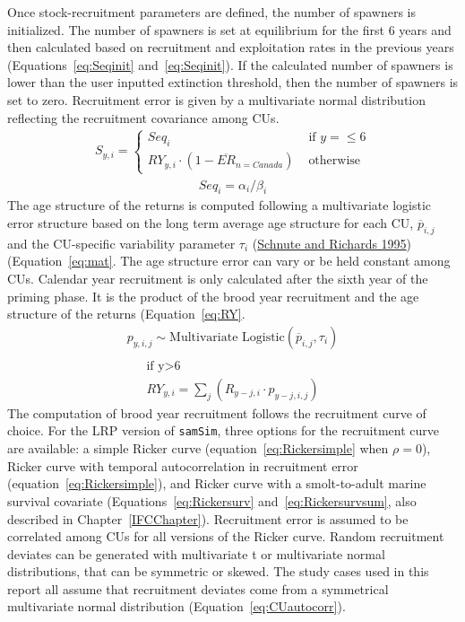 \documentclass[11pt]{book}
\begin{document}
Once stock-recruitment parameters are defined, the number of spawners is initialized. The number of spawners is set at equilibrium for the first 6 years and then calculated based on recruitment and exploitation rates in the previous years (Equations~\ref{eq:Seqinit} and~\ref{eq:Seqinit}). If the calculated number of spawners is lower than the user inputted extinction threshold, then the number of spawners is set to zero. Recruitment error is given by a multivariate normal distribution reflecting the recruitment covariance among CUs.
\begin{align}
S_{y,i} =
 \begin{cases}
   Seq_{i} &\text{ if } y = \leq 6\\
   RY_{y,i} \cdot (1- \overline{ER}_{n=Canada}) &\text{ otherwise}
  \end{cases}
  \label{eq:Seqinit}
\end{align}
\begin{align}
Seq_{i} = \alpha_{i}/\beta_{i}
\label{eq:Seq}
\end{align}
The age structure of the returns is computed following a multivariate logistic error structure based on the long term average age structure for each CU, \(\overline{p}_{i,j}\) and the CU-specific variability parameter \(\tau_i\) (\protect\hyperlink{ref-schnuteInfluenceErrorPopulation1995}{Schnute and Richards 1995}) (Equation~\ref{eq:mat}. The age structure error can vary or be held constant among CUs. Calendar year recruitment is only calculated after the sixth year of the priming phase. It is the product of the brood year recruitment and the age structure of the returns (Equation~\ref{eq:RY}.
\begin{align}
  p_{y,i,j} \sim \text{Multivariate Logistic}(\overline{p}_{i,j},\tau_{i}) \\
  \label{eq:mat}
\end{align}
\begin{align}
\text{if y>6}\\
  RY_{y,i} = \sum_j(R_{y-j,i} \cdot p_{y-j,i,j})
  \label{eq:RY}
\end{align}
The computation of brood year recruitment follows the recruitment curve of choice. For the LRP version of \texttt{samSim}, three options for the recruitment curve are available: a simple Ricker curve (equation~\ref{eq:Rickersimple} when \(\rho = 0\)), Ricker curve with temporal autocorrelation in recruitment error (equation~\ref{eq:Rickersimple}), and Ricker curve with a smolt-to-adult marine survival covariate (Equations~\ref{eq:Rickersurv} and~\ref{eq:Rickersurvsum}, also described in Chapter~\ref{IFCChapter}). Recruitment error is assumed to be correlated among CUs for all versions of the Ricker curve. Random recruitment deviates can be generated with multivariate t or multivariate normal distributions, that can be symmetric or skewed. The study cases used in this report all assume that recruitment deviates come from a symmetrical multivariate normal distribution (Equation~\ref{eq:CUautocorr}).
\end{document}
